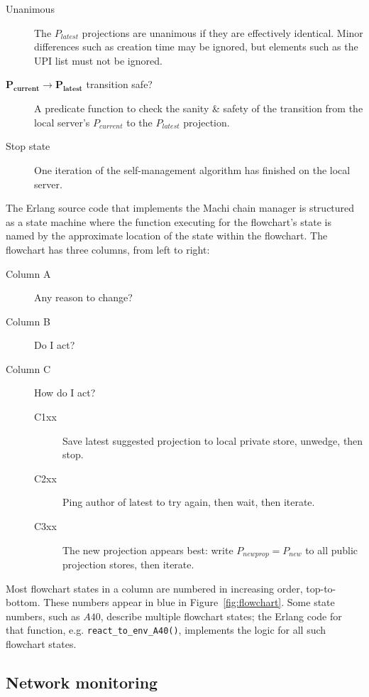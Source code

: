 \documentclass[preprint,10pt]{sigplanconf}
\begin{document}
\begin{description}
\item[Unanimous] The $P_{latest}$ projections are unanimous if they are
  effectively identical.  Minor differences such as creation time may
  be ignored, but elements such as the UPI list must not be ignored.

\item[$\mathbf{P_{current} \rightarrow P_{latest}}$ transition safe?]
  A predicate function to
  check the sanity \& safety of the transition from the local server's
  $P_{current}$ to the $P_{latest}$ projection.

\item[Stop state] One iteration of the self-management algorithm has
  finished on the local server.
\end{description}

The Erlang source code that implements the Machi chain manager is
structured as a state machine where the function executing for the
flowchart's state is named by the approximate location of the state
within the flowchart.  The flowchart has three columns, from left to
right: 

\begin{description}
\item[Column A] Any reason to change?
\item[Column B] Do I act?
\item[Column C] How do I act?
  \begin{description}
  \item[C1xx] Save latest suggested projection to local private store, unwedge,
    then stop.
  \item[C2xx] Ping author of latest to try again, then wait, then iterate.
  \item[C3xx] The new projection appears best: write
    $P_{newprop}=P_{new}$ to all public projection stores, then iterate.
  \end{description}
\end{description}

Most flowchart states in a column are numbered in increasing order,
top-to-bottom.  These numbers appear in blue in
Figure~\ref{fig:flowchart}.  Some state numbers, such as $A40$,
describe multiple flowchart states; the Erlang code for that function,
e.g. {\tt react\_to\_\-env\_A40()}, implements the logic for all such
flowchart states.

\subsection{Network monitoring}
\label{sub:humming-network-monitoring}
\end{document}
